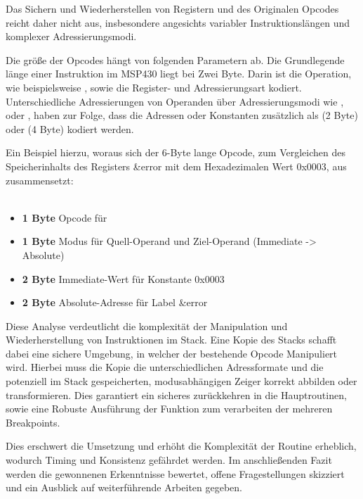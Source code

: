 Das Sichern und Wiederherstellen von Registern und des Originalen Opcodes reicht daher nicht aus, insbesondere angesichts variabler Instruktionsl\"angen und komplexer Adressierungsmodi. 

Die gr\"o{\ss}e der Opcodes h\"angt von folgenden Parametern ab. Die Grundlegende l\"ange einer Instruktion im MSP430 liegt bei Zwei Byte. Darin ist die Operation, wie beispielsweise , sowie die Register- und Adressierungsart kodiert. Unterschiedliche Adressierungen von Operanden \"uber Adressierungsmodi wie \glqq{}\grqq{}, \glqq{}\grqq{} oder \glqq{}\grqq{}, haben zur Folge, dass die Adressen oder Konstanten zus\"atzlich als  (2 Byte) oder  (4 Byte) kodiert werden.\\

Ein Beispiel hierzu, woraus sich der 6-Byte lange Opcode, zum Vergleichen des Speicherinhalts des Registers \glqq{}\&error\grqq{} mit dem Hexadezimalen Wert \glqq{}0x0003\grqq{}, aus  zusammensetzt: \\
\\\textbf{} 
\begin{itemize}
	\item \textbf{1 Byte} Opcode f\"ur 
	\item \textbf{1 Byte} Modus f\"ur Quell-Operand und Ziel-Operand (Immediate -> Absolute)
	\item \textbf{2 Byte} Immediate-Wert f\"ur Konstante \glqq{}0x0003\grqq{}
	\item \textbf{2 Byte} Absolute-Adresse f\"ur Label \glqq{}\&error\grqq{}
\end{itemize}

\newpage
Diese Analyse verdeutlicht die komplexit\"at der Manipulation und Wiederherstellung von Instruktionen im Stack. Eine Kopie des Stacks schafft dabei eine sichere Umgebung, in welcher der bestehende Opcode Manipuliert wird. Hierbei muss die Kopie die unterschiedlichen Adressformate und die potenziell im Stack gespeicherten, modusabh\"angigen Zeiger korrekt abbilden oder transformieren. Dies garantiert ein sicheres zur\"uckkehren in die Hauptroutinen, sowie eine Robuste Ausf\"uhrung der Funktion zum verarbeiten der \ggf mehreren Breakpoints.

Dies erschwert die Umsetzung und erh\"oht die Komplexit\"at der Routine erheblich, wodurch Timing und Konsistenz gef\"ahrdet werden. Im anschlie{\ss}enden Fazit werden die gewonnenen Erkenntnisse bewertet, offene Fragestellungen skizziert und ein Ausblick auf weiterf\"uhrende Arbeiten gegeben.

